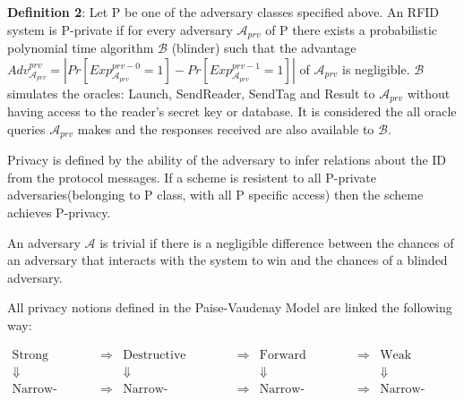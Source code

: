     \vspace{0.3cm}

    \textbf{Definition 2}: Let P be one of the adversary classes specified above. An RFID system is P-private if for
    every adversary $\mathcal{A}_{prv}$ of P there exists a probabilistic polynomial time algorithm $\mathcal{B}$ 
    (blinder) such that the advantage $Adv_{\mathcal{A}_{prv}}^{prv} = | Pr[Exp_{\mathcal{A}_{prv}}^{prv-0} = 1] - Pr[Exp_{\mathcal{A}_{prv}}^{prv-1} = 1] |$ 
    of $\mathcal{A}_{prv}$ is negligible. $\mathcal{B}$ simulates the oracles: Launch, SendReader, SendTag and
    Result to $\mathcal{A}_{prv}$ without having access to the reader's secret key or database. It is considered the all
    oracle queries $\mathcal{A}_{prv}$ makes and the responses received are also available to $\mathcal{B}$.

    Privacy is defined by the ability of the adversary to infer relations about the ID from the protocol
    messages. If a scheme is resistent to all P-private adversaries(belonging to P class, with all
    P specific access) then the scheme achieves P-privacy.

    An adversary $\mathcal{A}$ is trivial if there is a negligible difference between the chances
    of an adversary that interacts with the system to win and the chances of a blinded adversary.

    All privacy notions defined in the Paise-Vaudenay Model are linked the following way:

    \[
    \begin{array}{ccccccc}
        \text{Strong} & \Rightarrow & \text{Destructive} & \Rightarrow & \text{Forward} & \Rightarrow & \text{Weak} \\
        \Downarrow & &  \Downarrow  & &\Downarrow  & & \Downarrow \\
        \text{Narrow-Strong} & \Rightarrow & \text{Narrow-Destructive} & \Rightarrow & \text{Narrow-Forward} & \Rightarrow & \text{Narrow-Weak}
    \end{array}
    \]
